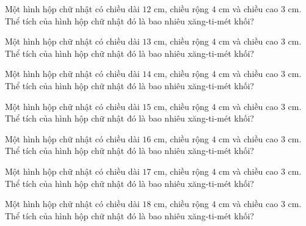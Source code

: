 \begin{ex}
  Một hình hộp chữ nhật có chiều dài $12\text{ cm}$, chiều rộng $4\text{ cm}$ và chiều cao $3\text{ cm}$. Thể tích của hình hộp chữ nhật đó là bao nhiêu xăng-ti-mét khối?
\end{ex}

\begin{ex}
  Một hình hộp chữ nhật có chiều dài $13\text{ cm}$, chiều rộng $4\text{ cm}$ và chiều cao $3\text{ cm}$. Thể tích của hình hộp chữ nhật đó là bao nhiêu xăng-ti-mét khối?
\end{ex}

\begin{ex}
  Một hình hộp chữ nhật có chiều dài $14\text{ cm}$, chiều rộng $4\text{ cm}$ và chiều cao $3\text{ cm}$. Thể tích của hình hộp chữ nhật đó là bao nhiêu xăng-ti-mét khối?
\end{ex}

\begin{ex}
  Một hình hộp chữ nhật có chiều dài $15\text{ cm}$, chiều rộng $4\text{ cm}$ và chiều cao $3\text{ cm}$. Thể tích của hình hộp chữ nhật đó là bao nhiêu xăng-ti-mét khối?
\end{ex}

\begin{ex}
  Một hình hộp chữ nhật có chiều dài $16\text{ cm}$, chiều rộng $4\text{ cm}$ và chiều cao $3\text{ cm}$. Thể tích của hình hộp chữ nhật đó là bao nhiêu xăng-ti-mét khối?
\end{ex}

\begin{ex}
  Một hình hộp chữ nhật có chiều dài $17\text{ cm}$, chiều rộng $4\text{ cm}$ và chiều cao $3\text{ cm}$. Thể tích của hình hộp chữ nhật đó là bao nhiêu xăng-ti-mét khối?
\end{ex}

\begin{ex}
  Một hình hộp chữ nhật có chiều dài $18\text{ cm}$, chiều rộng $4\text{ cm}$ và chiều cao $3\text{ cm}$. Thể tích của hình hộp chữ nhật đó là bao nhiêu xăng-ti-mét khối?
\end{ex}

